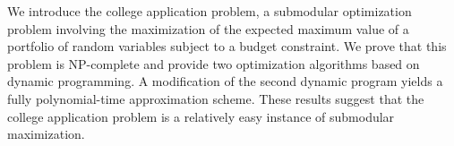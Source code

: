 We introduce the college application problem, a submodular optimization problem involving the maximization of the expected maximum value of a portfolio of random variables subject to a budget constraint. We prove that this problem is NP-complete and provide two optimization algorithms based on dynamic programming. A modification of the second dynamic program yields a fully polynomial-time approximation scheme. These results suggest that the college application problem is a relatively easy instance of submodular maximization.